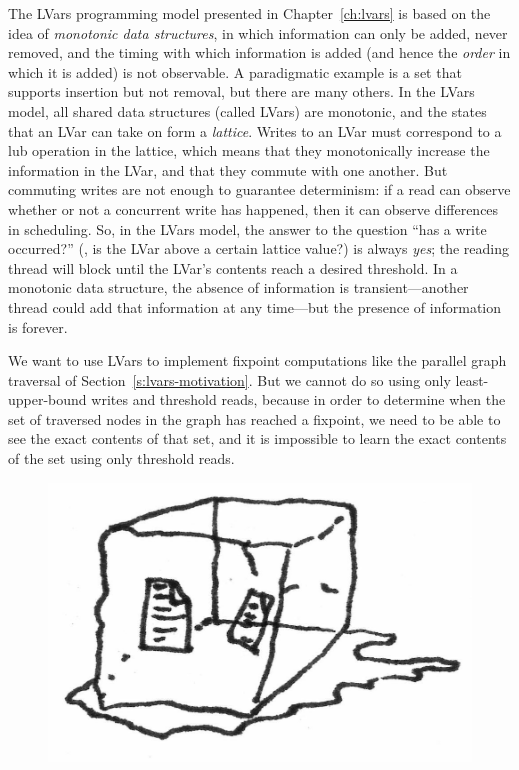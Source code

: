 \ifdefined\DISSERTATION
The LVars programming model presented in Chapter~\ref{ch:lvars} is
based on the idea of \emph{monotonic data structures}, in which
information can only be added, never removed, and the timing with
which information is added (and hence the \emph{order} in which it is
added) is not observable.  A paradigmatic example is a set that
supports insertion but not removal, but there are many others.  In the
LVars model, all shared data structures (called LVars) are monotonic,
and the states that an LVar can take on form a \emph{lattice}.  Writes
to an LVar must correspond to a lub operation in the lattice, which
means that they monotonically increase the information in the LVar,
and that they commute with one another.  But commuting writes are not
enough to guarantee determinism: if a read can observe whether or not
a concurrent write has happened, then it can observe differences in
scheduling.  So, in the LVars model, the answer to the question ``has
a write occurred?''  (\ie, is the LVar above a certain lattice value?)
is always
\emph{yes}; the reading thread will block until the LVar's contents
reach a desired threshold.  In a monotonic data structure, the absence
of information is transient---another thread could add that
information at any time---but the presence of information is forever.
\fi

We want to use LVars to implement fixpoint computations like the
parallel graph traversal of Section~\ref{s:lvars-motivation}.  But we
cannot do so using only least-upper-bound writes and threshold reads,
because in order to determine when the set of traversed nodes in the
graph has reached a fixpoint, we need to be able to see the exact
contents of that set, and it is impossible to learn the exact contents
of the set using only threshold reads.

\ifdefined\DISSERTATION
\begin{figure}
\vspace{-1em}
\begin{center}
  \includegraphics[scale=0.15]{../illustrations/frozen-data}
\end{center}
\vspace{-1em}
\end{figure}
\fi

